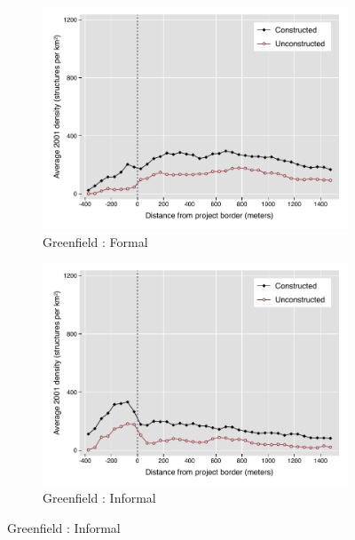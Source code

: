 \documentclass[12pt]{article}
\begin{document}
\begin{figure}
\caption{Separately by Project Type}
        \begin{subfigure}[b]{0.495\textwidth}
            \centering
        \caption{Greenfield : Formal}
            \includegraphics[width=\textwidth,trim={0.3cm .3cm 0.1cm 0cm}, clip=true]{figures/bblu_for_pre_means_4_1}
        \end{subfigure}
        \hfill
        \begin{subfigure}[b]{0.495\textwidth}  
            \centering 
        \caption{Greenfield : Informal}
            \includegraphics[width=\textwidth,trim={0.3cm .3cm 0.1cm 0cm}, clip=true]{figures/bblu_inf_pre_means_4_1.pdf}
        \end{subfigure}

\end{figure}
\end{document}
